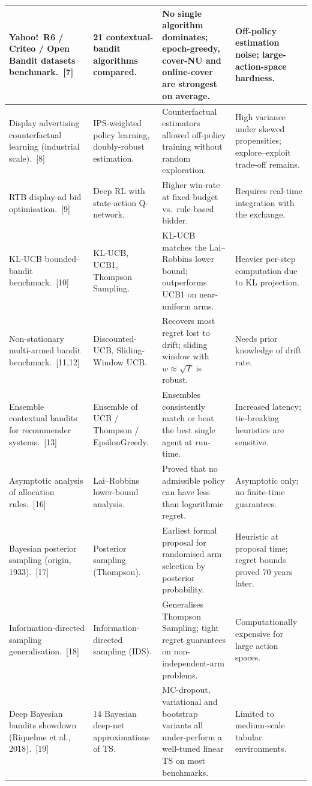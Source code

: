 {\begin{xltabular}{\linewidth}{|p{2.8cm}|p{3.0cm}|X|X|}
\hline
Yahoo!~R6 / Criteo / Open Bandit datasets benchmark.~[7] & 21 contextual-bandit algorithms compared. & No single algorithm dominates; epoch-greedy, cover-NU and online-cover are strongest on average. & Off-policy estimation noise; large-action-space hardness.\\
\hline
Display advertising counterfactual learning (industrial scale).~[8] & IPS-weighted policy learning, doubly-robust estimation. & Counterfactual estimators allowed off-policy training without random exploration. & High variance under skewed propensities; explore--exploit trade-off remains.\\
\hline
RTB display-ad bid optimisation.~[9] & Deep RL with state-action Q-network. & Higher win-rate at fixed budget vs.\ rule-based bidder. & Requires real-time integration with the exchange.\\
\hline
KL-UCB bounded-bandit benchmark.~[10] & KL-UCB, UCB1, Thompson Sampling. & KL-UCB matches the Lai--Robbins lower bound; outperforms UCB1 on near-uniform arms. & Heavier per-step computation due to KL projection.\\
\hline
Non-stationary multi-armed bandit benchmark.~[11,12] & Discounted-UCB, Sliding-Window UCB. & Recovers most regret lost to drift; sliding window with $w \approx \sqrt{T}$ is robust. & Needs prior knowledge of drift rate.\\
\hline
Ensemble contextual bandits for recommender systems.~[13] & Ensemble of UCB / Thompson / EpsilonGreedy. & Ensembles consistently match or beat the best single agent at run-time. & Increased latency; tie-breaking heuristics are sensitive.\\
\hline
Asymptotic analysis of allocation rules.~[16] & Lai--Robbins lower-bound analysis. & Proved that no admissible policy can have less than logarithmic regret. & Asymptotic only; no finite-time guarantees.\\
\hline
Bayesian posterior sampling (origin, 1933).~[17] & Posterior sampling (Thompson). & Earliest formal proposal for randomised arm selection by posterior probability. & Heuristic at proposal time; regret bounds proved 70 years later.\\
\hline
Information-directed sampling generalisation.~[18] & Information-directed sampling (IDS). & Generalises Thompson Sampling; tight regret guarantees on non-independent-arm problems. & Computationally expensive for large action spaces.\\
\hline
Deep Bayesian bandits showdown (Riquelme et al., 2018).~[19] & 14 Bayesian deep-net approximations of TS. & MC-dropout, variational and bootstrap variants all under-perform a well-tuned linear TS on most benchmarks. & Limited to medium-scale tabular environments.\\

\end{xltabular}}
